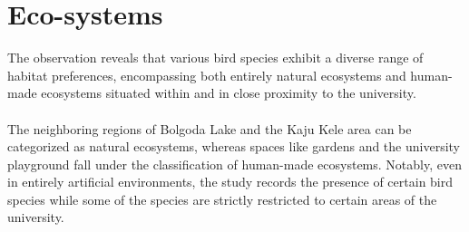 \section{Eco-systems}
The observation reveals that various bird species exhibit a diverse range of habitat preferences, encompassing both entirely natural ecosystems and human-made ecosystems situated within and in close proximity to the university.
\\\\
The neighboring regions of Bolgoda Lake and the Kaju Kele area can be categorized as natural ecosystems, whereas spaces like gardens and the university playground fall under the classification of human-made ecosystems. Notably, even in entirely artificial environments, the study records the presence of certain bird species while some of the species are strictly restricted to certain areas of the university.


